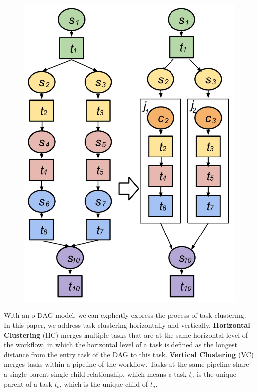\begin{figure}[!htb]
\centering
 \includegraphics[width=0.5\linewidth]{figures/model/vc.pdf}
  \label{fig:model_vc}
\end{figure}



With an o-DAG model, we can explicitly express the process of task clustering. In this paper, we address task clustering horizontally and vertically. \textbf{Horizontal Clustering} (HC) merges multiple tasks that are at the same horizontal level of the workflow, in which the horizontal level of a task is defined as the longest distance from the entry task of the DAG to this task. \textbf{Vertical Clustering} (VC) merges tasks within a pipeline of the workflow. Tasks at the same pipeline share a single-parent-single-child relationship, which means a task $t_a$ is the unique parent of a task $t_b$, which is the unique child of $t_a$. 


